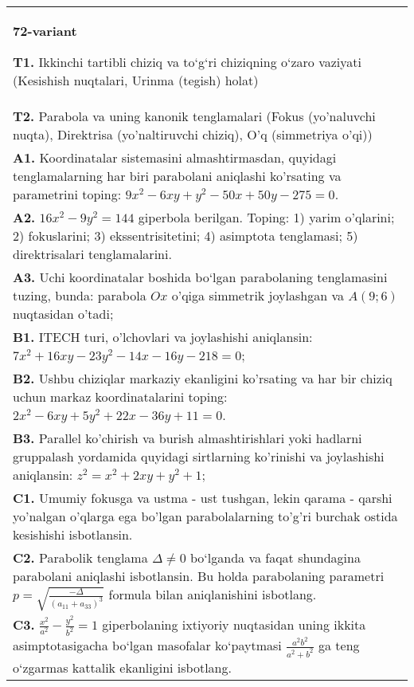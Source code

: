 \documentclass{article}
\begin{document}
\begin{tabular}{m{17cm}}
\textbf{72-variant}
\newline

\textbf{T1.} Ikkinchi tartibli chiziq va to‘g‘ri chiziqning o‘zaro vaziyati (Kesishish nuqtalari, Urinma (tegish) holat) \\
\textbf{T2.} Parabola va uning kanonik tenglamalari (Fokus (yo’naluvchi nuqta), Direktrisa (yo’naltiruvchi chiziq), O’q (simmetriya o’qi)) \\
\textbf{A1.} Koordinatalar sistemasini almashtirmasdan, quyidagi tenglamalarning har biri parabolani aniqlashi ko'rsating va parametrini toping: $9 x^2-6 x y+y^2-50 x+50 y-275=0$. \\
\textbf{A2.} $16 x^2-9 y^2=144$ giperbola berilgan. Toping: 1) yarim o'qlarini; 2) fokuslarini; 3) ekssentrisitetini; 4) asimptota tenglamasi; 5) direktrisalari tenglamalarini. \\
\textbf{A3.} Uchi koordinatalar boshida bo‘lgan parabolaning tenglamasini tuzing, bunda: parabola $Ox$ o'qiga simmetrik joylashgan va $A(9 ; 6)$ nuqtasidan o'tadi; \\
\textbf{B1.} ITECH turi, o'lchovlari va joylashishi aniqlansin: $7 x^2+16 x y-23 y^2-14 x-16 y-218=0$; \\
\textbf{B2.} Ushbu chiziqlar markaziy ekanligini ko'rsating va har bir chiziq uchun markaz koordinatalarini toping: $2 x^2-6 x y+5 y^2+22 x-36 y+11=0$. \\
\textbf{B3.} Parallel ko'chirish va burish almashtirishlari yoki hadlarni gruppalash yordamida quyidagi sirtlarning ko'rinishi va joylashishi aniqlansin: $z^2=x^2+2 x y+y^2+1$; \\
\textbf{C1.} Umumiy fokusga va ustma - ust tushgan, lekin qarama - qarshi yo'nalgan o'qlarga ega bo'lgan parabolalarning to'g'ri burchak ostida kesishishi isbotlansin. \\
\textbf{C2.} Parabolik tenglama $\Delta \neq 0$ bo‘lganda va faqat shundagina parabolani aniqlashi isbotlansin. Bu holda parabolaning parametri $p=\sqrt{\frac{-\Delta}{ (a_{11}+a_{33}) ^3}}$ formula bilan aniqlanishini isbotlang. \\
\textbf{C3.} $\frac{x^2}{a^2}-\frac{y^2}{b^2}=1$ giperbolaning ixtiyoriy nuqtasidan uning ikkita asimptotasigacha bo‘lgan masofalar ko‘paytmasi $\frac{a^2 b^2}{a^2+b^2}$ ga teng o‘zgarmas kattalik ekanligini isbotlang. \\

\end{tabular}
\vspace{1cm}
\end{document}
